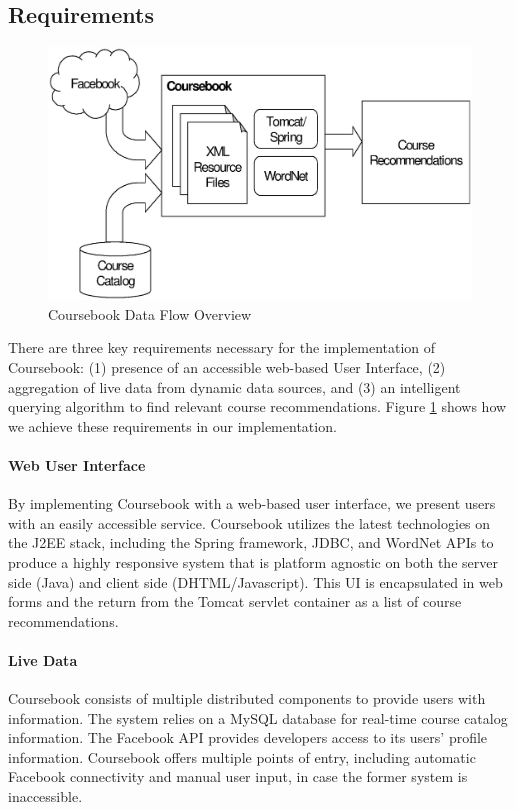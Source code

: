\subsection{Requirements}

\begin{figure}[t]
  \begin{center}
  \includegraphics[width=\textwidth]{images/overview}
  \caption{Coursebook Data Flow Overview}
  \label{fig:overview}
  \end{center}
\end{figure}

There are three key requirements necessary for the implementation of Coursebook:
(1) presence of an accessible web-based User Interface, (2) aggregation of live
data from dynamic data sources, and (3) an intelligent querying algorithm to
find relevant course recommendations. Figure \ref{fig:overview} shows how we
achieve these requirements in our implementation. 

\paragraph*{Web User Interface}
By implementing Coursebook with a web-based user interface, we present users 
with an easily accessible service. Coursebook utilizes the latest technologies 
on the J2EE stack, including the Spring framework, JDBC, and WordNet APIs to 
produce a highly responsive system that is platform agnostic on both the server
side (Java) and client side (DHTML/Javascript). This UI is encapsulated in web
forms and the return from the Tomcat servlet container as a list of course
recommendations.

\paragraph*{Live Data}
Coursebook consists of multiple distributed components to provide users with 
information. The system relies on a MySQL database for real-time course catalog
information. The Facebook API provides developers access to its users' profile 
information. Coursebook offers multiple points of entry, including automatic 
Facebook connectivity and manual user input, in case the former system is 
inaccessible.


